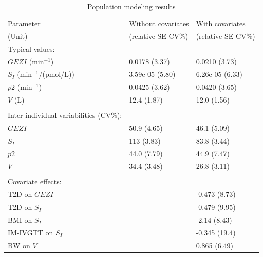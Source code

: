 \documentclass[utf8]{frontiersSCNS} %
\begin{document}
\begin{table}[h]
\caption{Population modeling results}
\label{tab:prm estimates}
\begin{tabular}{lll}
\hline
Parameter   & Without covariates & With covariates \\
(Unit)    & (relative SE-CV\%) & (relative SE-CV\%)\\ 
\hline
Typical values: \\
\hspace{.2cm} $GEZI$ (min$^{-1}$)                  & 0.0178 (3.37) & 0.0210 (3.73) \\
\hspace{.2cm} $S_I$ (min$^{-1}$/(pmol/L)) & 3.59e-05 (5.80)                          & 6.26e-05 (6.33)                        \\
\hspace{.2cm} $p2$ (min$^{-1}$)                    & 0.0425 (3.62) & 0.0420 (3.65) \\
\hspace{.2cm} $V$ (L)                         & 12.4 (1.87)   & 12.0 (1.56)   \\
                              &               &               \\
Inter-individual variabilities (CV\%): \\
\hspace{.2cm} $GEZI$                      & 50.9 (4.65)   & 46.1 (5.09)   \\
\hspace{.2cm} $S_I$                        & 113 (3.83)    & 83.8 (3.44)   \\
\hspace{.2cm} $p2$                        & 44.0 (7.79)   & 44.9 (7.47)   \\
\hspace{.2cm} $V$                         & 34.4 (3.48)   & 26.8 (3.11)   \\
                              &               &               \\
Covariate effects: &               &               \\
\hspace{.2cm} T2D on $GEZI$                  &               & -0.473 (8.73) \\
\hspace{.2cm} T2D on $S_I$                     &               & -0.479 (9.95) \\
\hspace{.2cm} BMI on $S_I$                     &               & -2.14 (8.43)  \\
\hspace{.2cm} IM-IVGTT on $S_I$                       &               & -0.345 (19.4)  \\ 
\hspace{.2cm} BW on $V$                       &               & 0.865 (6.49)  \\ 


\end{tabular}
\end{table}
\end{document}
